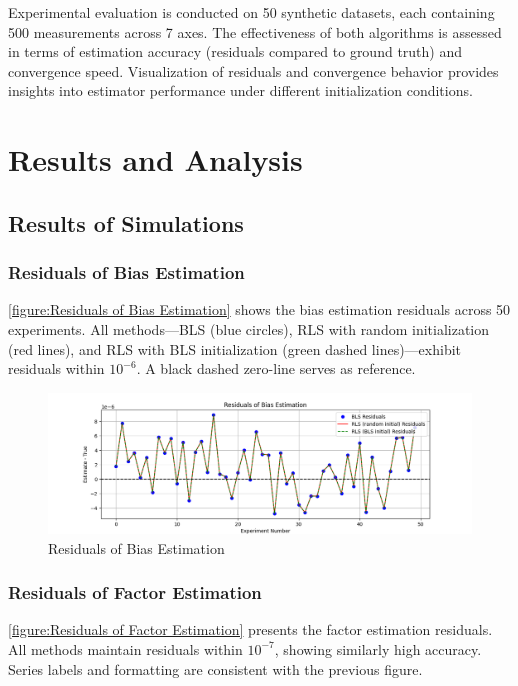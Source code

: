 \documentclass[openany,12pt,UTF8]{article}
\begin{document}
Experimental evaluation is conducted on 50 synthetic datasets, each containing 500 measurements across 7 axes. The effectiveness of both algorithms is assessed in terms of estimation accuracy (residuals compared to ground truth) and convergence speed. Visualization of residuals and convergence behavior provides insights into estimator performance under different initialization conditions.

\section{Results and Analysis}

\subsection{Results of Simulations}

\subsubsection{Residuals of Bias Estimation}
\autoref{figure:Residuals of Bias Estimation} shows the bias estimation residuals across 50 experiments. All methods—BLS (blue circles), RLS with random initialization (red lines), and RLS with BLS initialization (green dashed lines)—exhibit residuals within $10^{-6}$. A black dashed zero-line serves as reference.

\begin{figure}[h]\centering
\includegraphics[width=\columnwidth]{figures/Residuals of Bias Estimation.png}
\caption{Residuals of Bias Estimation}
\label{figure:Residuals of Bias Estimation}
\end{figure}

\subsubsection{Residuals of Factor Estimation}
\autoref{figure:Residuals of Factor Estimation} presents the factor estimation residuals. All methods maintain residuals within $10^{-7}$, showing similarly high accuracy. Series labels and formatting are consistent with the previous figure.
\end{document}
